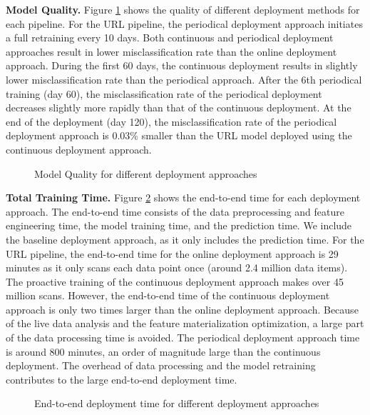 \textbf{Model Quality. }
Figure \ref{deployment-quality-figure} shows the quality of different deployment methods for each pipeline. 
For the URL pipeline, the periodical deployment approach initiates a full retraining every 10 days.
Both continuous and periodical deployment approaches result in lower misclassification rate than the online deployment approach.
During the first 60 days, the continuous deployment results in slightly lower misclassification rate than the periodical approach.
After the 6th periodical training (day 60), the misclassification rate of the periodical deployment decreases slightly more rapidly than that of the continuous deployment. 
At the end of the deployment (day 120), the misclassification rate of the periodical deployment approach is 0.03\% smaller than the URL model deployed using the continuous deployment approach.
\begin{figure}[h!]
\centering
\resizebox{\columnwidth}{!}{}
\caption{Model Quality for different deployment approaches}
\label{deployment-quality-figure}
\end{figure}

\textbf{Total Training Time. }
Figure \ref{deployment-time-figure} shows the end-to-end  time for each deployment approach.
The end-to-end time consists of the data preprocessing and feature engineering time, the model training time, and the prediction time. 
We include the baseline deployment approach, as it only includes the prediction time.
For the URL pipeline, the end-to-end time for the online deployment approach is 29 minutes as it only scans each data point once (around 2.4 million data items).  
The proactive training of the continuous deployment approach makes over 45 million scans.
However, the end-to-end time of the continuous deployment approach is only two times larger than the online deployment approach. 
Because of the live data analysis and the feature materialization optimization, a large part of the data processing time is avoided.
The periodical deployment approach time is around 800 minutes, an order of magnitude large than the continuous deployment. 
The overhead of data processing and the model retraining contributes to the large end-to-end deployment time.


\begin{figure}[h!]
\centering
\resizebox{\columnwidth}{!}{}
\caption{End-to-end deployment time for different deployment approaches}
\label{deployment-time-figure}
\end{figure}

